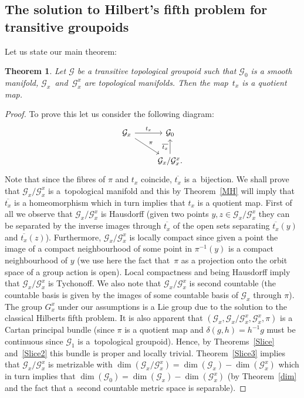 \documentclass[11pt]{article}
\newtheorem{tw}{Theorem}[section]
\begin{document}
\subsection{The solution to Hilbert's fifth problem for transitive groupoids}
Let us state our main theorem:
\begin{tw} Let $\mathcal{G}$ be a transitive topological groupoid such that $\mathcal{G}_0$ is a smooth manifold, $\mathcal{G}_x$~and~$\mathcal{G}^x_x$ are topological manifolds. Then the map~$t_x$ is a quotient map.
\end{tw}
\begin{proof} To prove this let us consider the following diagram:
\begin{equation*}
\begin{tikzcd}
\mathcal{G}_x \arrow[rd, "\pi"] \arrow[r, "t_x"] & \mathcal{G}_0 \\
& \mathcal{G}_x\slash\mathcal{G}^x_x.\arrow[u, "\overline{t_x}"]
\end{tikzcd}
\end{equation*}
Note that since the fibres of $\pi$ and $t_x$ coincide, $\overline{t_x}$ is a~bijection. We shall prove that $\mathcal{G}_x\slash\mathcal{G}_x^x$ is a~topological manifold and this by Theorem~\ref{MH} will imply that $\overline{t_x}$ is a homeomorphism which in turn implies that $t_x$ is a quotient map. First of all we observe that $\mathcal{G}_x\slash\mathcal{G}_x^x$ is Hausdorff (given two points $y,z\in\mathcal{G}_x\slash\mathcal{G}_x^x$ they can be separated by the inverse images through $\overline{t_x}$ of the open sets separating $\overline{t_x}(y)$ and $\overline{t_x}(z)$). Furthermore, $\mathcal{G}_x\slash\mathcal{G}_x^x$ is locally compact since given a point  the image of a compact neighbourhood of some point in $\pi^{-1}(y)$ is a compact neighbourhood of $y$ (we use here the fact that~$\pi$ as a projection onto the orbit space of a group action is open). Local compactness and being Hausdorff imply that $\mathcal{G}_x\slash\mathcal{G}_x^x$ is Tychonoff. We also note that $\mathcal{G}_x\slash\mathcal{G}_x^x$ is second countable (the countable basis is given by the images of some countable basis of $\mathcal{G}_x$ through $\pi$). The group $G^x_x$ under our assumptions is a Lie group due to the solution to the classical Hilberts fifth problem. It is also apparent that $(\mathcal{G}_x,\mathcal{G}_x\slash\mathcal{G}_x^x,\mathcal{G}_x^x,\pi)$ is a Cartan principal bundle (since $\pi$ is a quotient map and $\delta(g,h)=h^{-1}g$ must be continuous since $\mathcal{G}_1$ is a~topological groupoid). Hence, by Theorems~\ref{Slice} and~\ref{Slice2} this bundle is proper and locally trivial. Theorem~\ref{Slice3} implies that $\mathcal{G}_x\slash\mathcal{G}_x^x$ is metrizable with $\dim(\mathcal{G}_x\slash\mathcal{G}_x^x)=\dim(\mathcal{G}_x)-\dim(\mathcal{G}_x^x)$ which in turn implies that $\dim(\mathcal{G}_0)= \dim(\mathcal{G}_x)-\dim(\mathcal{G}_x^x)$ (by Theorem~\ref{dim} and the fact that a~second countable metric space is separable).


\end{proof}
\end{document}
